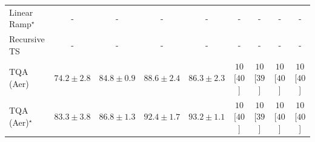 \begin{tabular}{l|cccc|cccc|}
Linear Ramp$^\star$ & {\cellcolor[HTML]{000000}} \color[HTML]{F1F1F1} {\cellcolor{white}} \color{black} - & {\cellcolor[HTML]{000000}} \color[HTML]{F1F1F1} {\cellcolor{white}} \color{black} - & {\cellcolor[HTML]{000000}} \color[HTML]{F1F1F1} {\cellcolor{white}} \color{black} - & {\cellcolor[HTML]{000000}} \color[HTML]{F1F1F1} {\cellcolor{white}} \color{black} - & {\cellcolor[HTML]{000000}} \color[HTML]{F1F1F1} {\cellcolor{white}} \color{black} - & {\cellcolor[HTML]{000000}} \color[HTML]{F1F1F1} {\cellcolor{white}} \color{black} - & {\cellcolor[HTML]{000000}} \color[HTML]{F1F1F1} {\cellcolor{white}} \color{black} - & {\cellcolor[HTML]{000000}} \color[HTML]{F1F1F1} {\cellcolor{white}} \color{black} - \\
Recursive TS & {\cellcolor[HTML]{000000}} \color[HTML]{F1F1F1} {\cellcolor{white}} \color{black} - & {\cellcolor[HTML]{000000}} \color[HTML]{F1F1F1} {\cellcolor{white}} \color{black} - & {\cellcolor[HTML]{000000}} \color[HTML]{F1F1F1} {\cellcolor{white}} \color{black} - & {\cellcolor[HTML]{000000}} \color[HTML]{F1F1F1} {\cellcolor{white}} \color{black} - & {\cellcolor[HTML]{000000}} \color[HTML]{F1F1F1} {\cellcolor{white}} \color{black} - & {\cellcolor[HTML]{000000}} \color[HTML]{F1F1F1} {\cellcolor{white}} \color{black} - & {\cellcolor[HTML]{000000}} \color[HTML]{F1F1F1} {\cellcolor{white}} \color{black} - & {\cellcolor[HTML]{000000}} \color[HTML]{F1F1F1} {\cellcolor{white}} \color{black} - \\
TQA (Aer) & {\cellcolor[HTML]{FEDD84}} \color[HTML]{000000} $74.2\pm 2.8$ & {\cellcolor[HTML]{EE7416}} \color[HTML]{F1F1F1} $84.8\pm 0.9$ & {\cellcolor[HTML]{D15205}} \color[HTML]{F1F1F1} $88.6\pm 2.4$ & {\cellcolor[HTML]{E3660F}} \color[HTML]{F1F1F1} $86.3\pm 2.3$ & {\cellcolor[HTML]{FFF7F3}} \color[HTML]{000000} $10$ [$40$] & {\cellcolor[HTML]{FFF7F3}} \color[HTML]{000000} $10$ [$39$] & {\cellcolor[HTML]{FFF7F3}} \color[HTML]{000000} $10$ [$40$] & {\cellcolor[HTML]{FFF7F3}} \color[HTML]{000000} $10$ [$40$] \\
TQA (Aer)$^\star$ & {\cellcolor[HTML]{F5841E}} \color[HTML]{F1F1F1} $83.3\pm 3.8$ & {\cellcolor[HTML]{DF620D}} \color[HTML]{F1F1F1} $86.8\pm 1.3$ & {\cellcolor[HTML]{A33904}} \color[HTML]{F1F1F1} $92.4\pm 1.7$ & {\cellcolor[HTML]{993404}} \color[HTML]{F1F1F1} $93.2\pm 1.1$ & {\cellcolor[HTML]{FFF7F3}} \color[HTML]{000000} $10$ [$40$] & {\cellcolor[HTML]{FFF7F3}} \color[HTML]{000000} $10$ [$39$] & {\cellcolor[HTML]{FFF7F3}} \color[HTML]{000000} $10$ [$40$] & {\cellcolor[HTML]{FFF7F3}} \color[HTML]{000000} $10$ [$40$] \\

\end{tabular}
